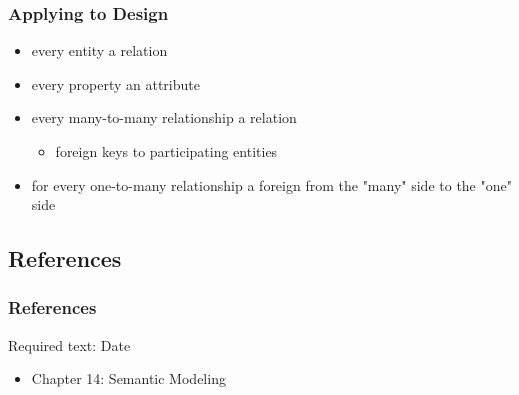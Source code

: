 \documentclass[dvipsnames]{beamer}
\begin{document}
\begin{frame}
  \frametitle{Applying to Design}

  \begin{itemize}
    \item every entity a relation

    \pause
    \item every property an attribute

    \pause
    \item every many-to-many relationship a relation
    \begin{itemize}
      \item foreign keys to participating entities
    \end{itemize}

    \pause
    \item for every one-to-many relationship a foreign from the
      "many" side to the "one" side
 \end{itemize}
\end{frame}

\subsection*{References}

\begin{frame}
  \frametitle{References}

  \begin{block}{Required text: Date}
    \begin{itemize}
      \item Chapter 14: \alert{Semantic Modeling}
    \end{itemize}
  \end{block}
\end{frame}
\end{document}
